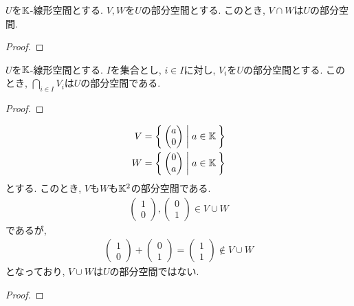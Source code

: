 \begin{example}
  $U$を$\mathbb{K}$-線形空間とする.
  $V, W$を$U$の部分空間とする.
  このとき, $V\cap W$は$U$の部分空間.
\end{example}
\begin{proof}\end{proof}


\begin{example}
  $U$を$\mathbb{K}$-線形空間とする.
  $I$を集合とし,
  $i\in I$に対し, $V_i$を$U$の部分空間とする.
  このとき, $\bigcap_{i\in I}V_i$は$U$の部分空間である.
\end{example}
\begin{proof}\end{proof}


\begin{example}
  \label{subspace:nonexample:cup}
  \begin{align*}
    V&=\Set{\begin{pmatrix}a\\0\end{pmatrix}|a\in\mathbb{K}}\\
    W&=\Set{\begin{pmatrix}0\\a\end{pmatrix}|a\in\mathbb{K}}
  \end{align*}
  とする.
  このとき, $V$も$W$も$\mathbb{K}^2$の部分空間である.
  \begin{align*}
    \begin{pmatrix}1\\0\end{pmatrix},
    \begin{pmatrix}0\\1\end{pmatrix}\in V\cup W
  \end{align*}
  であるが,
  \begin{align*}
    \begin{pmatrix}1\\0\end{pmatrix}+
    \begin{pmatrix}0\\1\end{pmatrix}=\begin{pmatrix}1\\1\end{pmatrix}\not\in V\cup W
  \end{align*}
  となっており, $V\cup W$は$U$の部分空間ではない.
\end{example}
\begin{proof}\end{proof}

